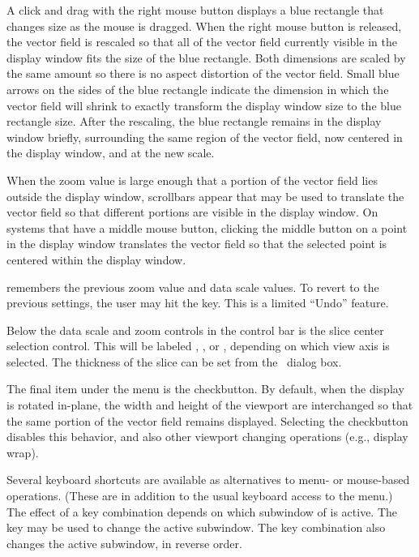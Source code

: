 A click and drag with the right mouse button displays a blue rectangle
that changes size as the mouse is dragged.  When the right mouse button
is released, the vector field is rescaled so that all of the vector
field currently visible in the display window fits the size of the
blue rectangle.  Both dimensions are scaled by the same amount so there
is no aspect distortion of the vector field.  Small blue arrows on the
sides of the blue rectangle indicate the dimension in which the vector
field will shrink to exactly transform the display window size to the
blue rectangle size.  After the rescaling, the blue rectangle remains in
the display window briefly, surrounding the same region of the vector
field, now centered in the display window, and at the new scale.

When the zoom value is large enough that a portion of the vector field
lies outside the display window, scrollbars appear that may be used to
translate the vector field so that different portions are visible in the
display window.  On systems that have a middle mouse button, clicking
the middle button on a point in the display window translates the vector
field so that the selected point is centered within the display window.

 remembers the previous zoom value and data scale values.
To revert to the previous settings, the user may hit the  key.
This is a limited ``Undo'' feature.

Below the data scale and zoom controls in the control bar is the slice
center selection control.  This will be
labeled , , or , depending on
which view axis is selected.  The thickness of the slice can be set
from the \ dialog box.

The final item under the  menu is the
 checkbutton.  By default, when the
display is rotated in-plane, the width and height of the viewport are
interchanged so that the same portion of the vector field remains
displayed.  Selecting the  checkbutton
disables this behavior, and also other viewport changing operations
(e.g., display wrap).

Several keyboard shortcuts are available as alternatives to menu- or
mouse-based operations.  (These are in addition to the usual keyboard
access to the menu.)  The effect of a key combination depends on which
subwindow of  is active.  The  key may be used to
change the active subwindow.  The  key combination also
changes the active subwindow, in reverse order.

